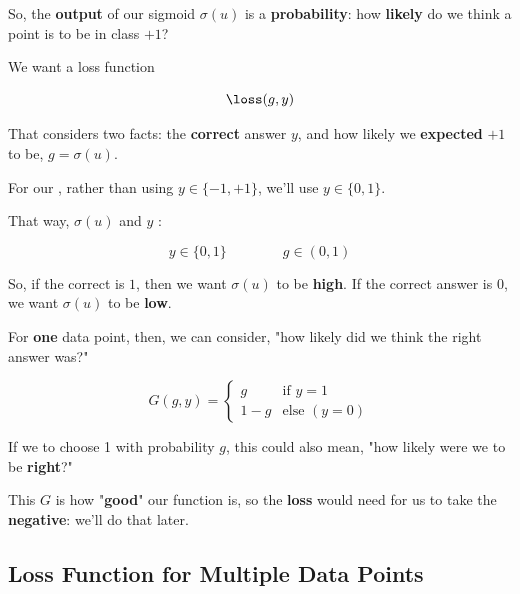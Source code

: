         So, the \textbf{output} of our sigmoid $\sigma(u)$ is a \textbf{probability}: how \textbf{likely} do we think a point is to be in class $+1$?
        
        We want a loss function
        
        \begin{equation}
            \loss(g,y)
        \end{equation}
        
        That considers two facts: the \textbf{correct} answer $y$, and how likely we \textbf{expected} $+1$ to be, $g=\sigma(u)$.\\
        
        \begin{notation}
            For our , rather than using $y \in \{-1,+1\}$, we'll use $ y \in \{0,1\}$.
            
            That way, $\sigma(u)$ and $y$ :
            
            \begin{equation*}
                y \in \{0,1\} \qquad \qquad g \in (0,1)
            \end{equation*}
        \end{notation}
        
        So, if the correct is $1$, then we want $\sigma(u)$ to be \textbf{high}. If the correct answer is $0$, we want $\sigma(u)$ to be \textbf{low}.
        
        For \textbf{one} data point, then, we can consider, "how likely did we think the right answer was?"
        
        \begin{equation}
            G(g,y) = 
            \begin{cases}
                g & \text{if } y=1 \\
                1-g & \text{else } (y=0)
            \end{cases}
        \end{equation}
        
        If we to choose 1 with probability $g$, this could also mean, "how likely were we to be \textbf{right}?"
        
        This $G$ is how "\textbf{good}" our function is, so the \textbf{loss} would need for us to take the \textbf{negative}: we'll do that later.
        
    \subsection{Loss Function for Multiple Data Points}
    
